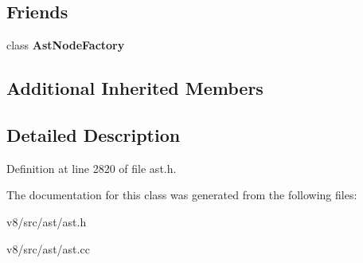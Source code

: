\subsection*{Friends}
\begin{DoxyCompactItemize}
\item 
\mbox{\label{classv8_1_1internal_1_1GetTemplateObject_a8d587c8ad3515ff6433eb83c578e795f}} 
class {\bfseries Ast\+Node\+Factory}
\end{DoxyCompactItemize}
\subsection*{Additional Inherited Members}


\subsection{Detailed Description}


Definition at line 2820 of file ast.\+h.



The documentation for this class was generated from the following files\+:\begin{DoxyCompactItemize}
\item 
v8/src/ast/ast.\+h\item 
v8/src/ast/ast.\+cc\end{DoxyCompactItemize}
